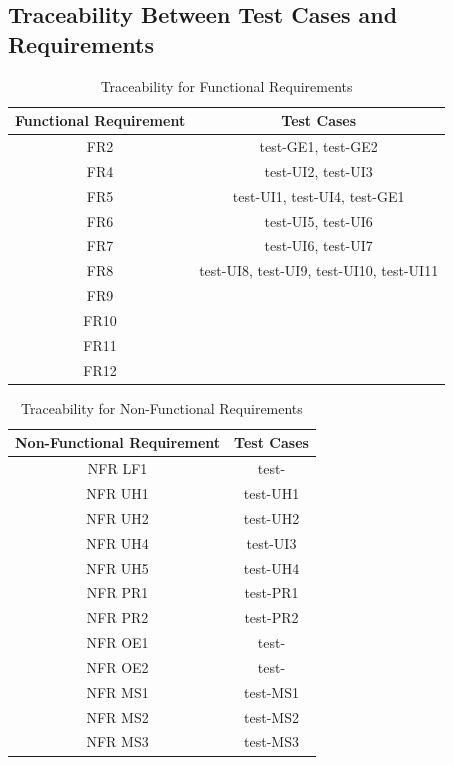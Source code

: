 \documentclass[12pt, titlepage]{article}
\begin{document}
\subsection{Traceability Between Test Cases and Requirements}%
\begin{table}[H]
  \begin{center}
    \caption{Traceability for Functional Requirements}
    \label{tab:table1}
    \begin{tabular}{c|c} 
        \toprule
        \textbf{Functional Requirement} & \textbf{Test Cases}\\
        \midrule
        FR2 & test-GE1, test-GE2\\
        \hline
        FR4 & test-UI2, test-UI3\\
        \hline
        FR5 & test-UI1, test-UI4, test-GE1\\
        \hline
        FR6 & test-UI5, test-UI6\\
        \hline
        FR7 & test-UI6, test-UI7\\
        \hline
        FR8 & test-UI8, test-UI9, test-UI10, test-UI11\\
        \hline
        FR9 &  \\
        \hline
        FR10 & \\
        \hline
        FR11 & \\
        \hline
        FR12 & \\
        \bottomrule
    \end{tabular}
  \end{center}
\end{table}

\begin{table}[H]
  \begin{center}
    \caption{Traceability for Non-Functional Requirements}
    \label{tab:table1}
    \begin{tabular}{c|c} 
        \toprule
        \textbf{Non-Functional Requirement} & \textbf{Test Cases}\\
        \midrule
        NFR LF1 & test- \\
        \hline
        NFR UH1 & test-UH1\\
        \hline
        NFR UH2 & test-UH2\\
        \hline
        NFR UH4 & test-UI3\\
        \hline
        NFR UH5 & test-UH4\\
        \hline
        NFR PR1 & test-PR1\\
        \hline
        NFR PR2 & test-PR2\\
        \hline
        NFR OE1 & test- \\
        \hline
        NFR OE2 & test- \\
        \hline
        NFR MS1 & test-MS1\\
        \hline
        NFR MS2 & test-MS2\\
        \hline
        NFR MS3 & test-MS3 \\
        \bottomrule
    \end{tabular}
  \end{center}
\end{table}
\end{document}

